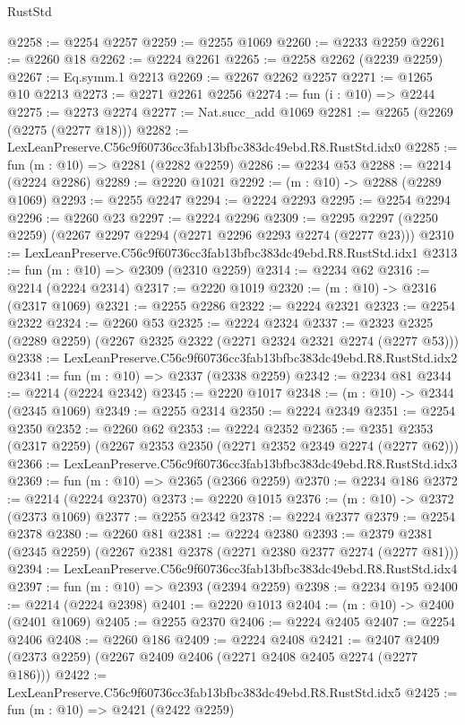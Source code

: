 \begin{lexlean}{RustStd}
\begin{coremodule}
@2258 := @2254 @2257
@2259 := @2255 @1069
@2260 := @2233 @2259
@2261 := @2260 @18
@2262 := @2224 @2261
@2265 := @2258 @2262 (@2239 @2259)
@2267 := Eq.symm.{1} @2213
@2269 := @2267 @2262 @2257
@2271 := @1265 @10 @2213
@2273 := @2271 @2261 @2256
@2274 := fun (i : @10) => @2244
@2275 := @2273 @2274
@2277 := Nat.succ_add @1069
@2281 := @2265 (@2269 (@2275 (@2277 @18)))
@2282 := LexLeanPreserve.C56c9f60736cc3fab13bfbc383dc49ebd.R8.RustStd.idx0
@2285 := fun (m : @10) => @2281 (@2282 @2259)
@2286 := @2234 @53
@2288 := @2214 (@2224 @2286)
@2289 := @2220 @1021
@2292 := (m : @10) -> @2288 (@2289 @1069)
@2293 := @2255 @2247
@2294 := @2224 @2293
@2295 := @2254 @2294
@2296 := @2260 @23
@2297 := @2224 @2296
@2309 := @2295 @2297 (@2250 @2259) (@2267 @2297 @2294 (@2271 @2296 @2293 @2274 (@2277 @23)))
@2310 := LexLeanPreserve.C56c9f60736cc3fab13bfbc383dc49ebd.R8.RustStd.idx1
@2313 := fun (m : @10) => @2309 (@2310 @2259)
@2314 := @2234 @62
@2316 := @2214 (@2224 @2314)
@2317 := @2220 @1019
@2320 := (m : @10) -> @2316 (@2317 @1069)
@2321 := @2255 @2286
@2322 := @2224 @2321
@2323 := @2254 @2322
@2324 := @2260 @53
@2325 := @2224 @2324
@2337 := @2323 @2325 (@2289 @2259) (@2267 @2325 @2322 (@2271 @2324 @2321 @2274 (@2277 @53)))
@2338 := LexLeanPreserve.C56c9f60736cc3fab13bfbc383dc49ebd.R8.RustStd.idx2
@2341 := fun (m : @10) => @2337 (@2338 @2259)
@2342 := @2234 @81
@2344 := @2214 (@2224 @2342)
@2345 := @2220 @1017
@2348 := (m : @10) -> @2344 (@2345 @1069)
@2349 := @2255 @2314
@2350 := @2224 @2349
@2351 := @2254 @2350
@2352 := @2260 @62
@2353 := @2224 @2352
@2365 := @2351 @2353 (@2317 @2259) (@2267 @2353 @2350 (@2271 @2352 @2349 @2274 (@2277 @62)))
@2366 := LexLeanPreserve.C56c9f60736cc3fab13bfbc383dc49ebd.R8.RustStd.idx3
@2369 := fun (m : @10) => @2365 (@2366 @2259)
@2370 := @2234 @186
@2372 := @2214 (@2224 @2370)
@2373 := @2220 @1015
@2376 := (m : @10) -> @2372 (@2373 @1069)
@2377 := @2255 @2342
@2378 := @2224 @2377
@2379 := @2254 @2378
@2380 := @2260 @81
@2381 := @2224 @2380
@2393 := @2379 @2381 (@2345 @2259) (@2267 @2381 @2378 (@2271 @2380 @2377 @2274 (@2277 @81)))
@2394 := LexLeanPreserve.C56c9f60736cc3fab13bfbc383dc49ebd.R8.RustStd.idx4
@2397 := fun (m : @10) => @2393 (@2394 @2259)
@2398 := @2234 @195
@2400 := @2214 (@2224 @2398)
@2401 := @2220 @1013
@2404 := (m : @10) -> @2400 (@2401 @1069)
@2405 := @2255 @2370
@2406 := @2224 @2405
@2407 := @2254 @2406
@2408 := @2260 @186
@2409 := @2224 @2408
@2421 := @2407 @2409 (@2373 @2259) (@2267 @2409 @2406 (@2271 @2408 @2405 @2274 (@2277 @186)))
@2422 := LexLeanPreserve.C56c9f60736cc3fab13bfbc383dc49ebd.R8.RustStd.idx5
@2425 := fun (m : @10) => @2421 (@2422 @2259)

\end{coremodule}
\end{lexlean}
